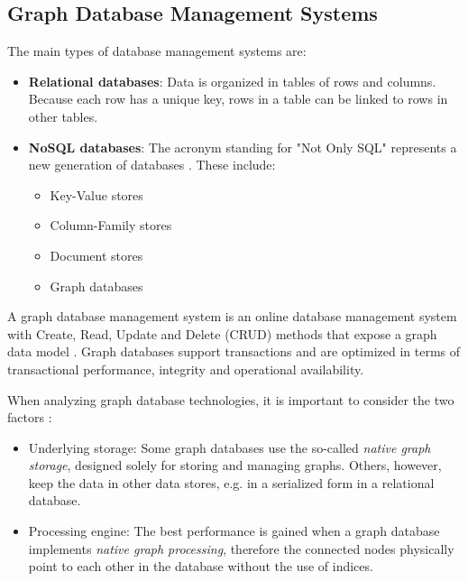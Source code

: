\documentclass[12pt]{report}
\begin{document}
\subsection{Graph Database Management Systems}

The main types of database management systems are:
\begin{itemize}
\item {\bf Relational databases}: Data is organized in tables of rows and columns. Because each row has a unique key, rows in a table can be linked to rows in other tables.
\item {\bf NoSQL databases}: The acronym standing for "Not Only SQL" represents a new generation of databases \cite{learning_neo4j}. These include:
\begin{itemize}
\item Key-Value stores
\item Column-Family stores
\item Document stores
\item Graph databases
\end{itemize}
\end{itemize}

A graph database management system is an online database management system with Create, Read, Update and Delete (CRUD) methods that expose a graph data model \cite{graph_databases}. Graph databases support transactions and are optimized in terms of transactional performance, integrity and operational availability.

When analyzing graph database technologies, it is important to consider the two factors \cite{graph_databases}:
\begin{itemize}
\item Underlying storage: Some graph databases use the so-called \textit{native graph storage}, designed solely for storing and managing graphs. Others, however, keep the data in other data stores, e.g. in a serialized form in a relational database.
\item Processing engine: The best performance is gained when a graph database implements \textit{native graph processing}, therefore the connected nodes physically point to each other in the database without the use of indices.
\end{itemize}
\end{document}
